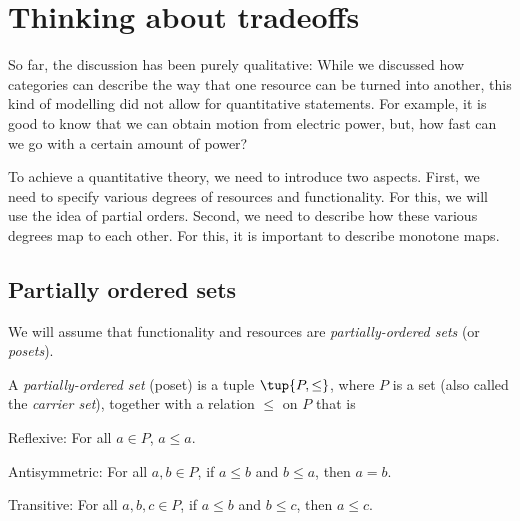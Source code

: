 \section{Thinking about tradeoffs}
So far, the discussion has been purely qualitative: While we discussed how
categories can describe the way that one resource can be turned into another,
this kind of modelling did not allow for quantitative statements. For example, it
is good to know that we can obtain motion from electric power, but, how fast can
we go with a certain amount of power?

To achieve a quantitative theory, we need to introduce two aspects.
First, we need to specify various degrees of resources and functionality.
For this, we will use the idea of partial orders.
Second, we need to describe how these various degrees map to each other.
For this, it is important to describe monotone maps.

\subsection{Partially ordered sets}

We will assume that functionality and resources
are \emph{partially-ordered sets} (or \emph{posets}).%



\begin{definition}
    A \emph{partially-ordered set} (poset) is a tuple $ \tup{P, \leq}$,
where $P$ is a set (also called the \emph{carrier set}), together with a
relation $\leq$ on $P$ that is
\begin{compactenum}
    \item Reflexive: For all $a\in P$, $a\leq a$.
    \item Antisymmetric: For all $a,b\in P$, if $a\leq b$ and $b\leq a$, then $a=b$.
    \item Transitive: For all $a,b,c\in P$, if $a\leq b$ and $b\leq c$, then $a\leq c$.
\end{compactenum}
\end{definition}


